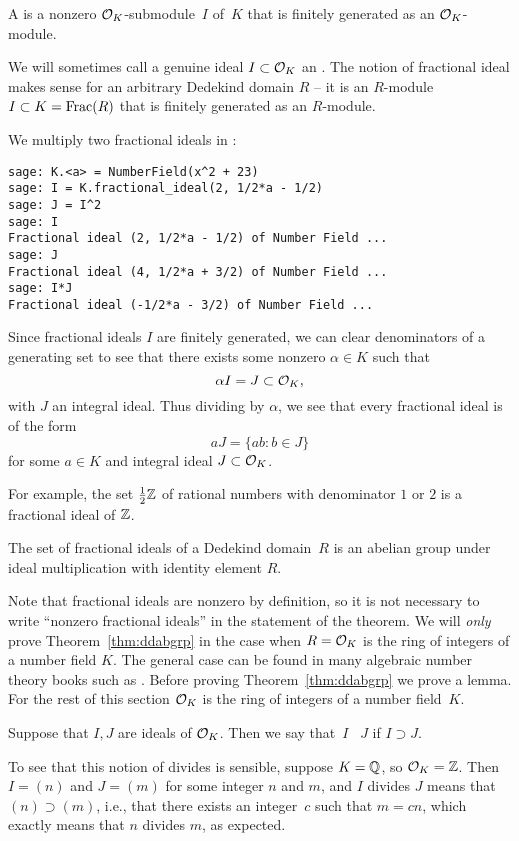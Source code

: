 \begin{definition}\label{def:fracideal}
A  is a nonzero $\mathcal{O}_K$-submodule~$I$ of~$K$ that
is finitely generated as an $\mathcal{O}_K$-module.
\end{definition}
We will sometimes call a genuine ideal $I\subset \mathcal{O}_K$ an
.  The notion of fractional ideal makes
sense for an arbitrary Dedekind domain $R$ -- it is an
$R$-module $I\subset K=\operatorname{Frac}(R)$ that is finitely
generated as an $R$-module.

\begin{example}
We multiply two fractional ideals in \sage:
\begin{lstlisting}
sage: K.<a> = NumberField(x^2 + 23)
sage: I = K.fractional_ideal(2, 1/2*a - 1/2)
sage: J = I^2
sage: I
Fractional ideal (2, 1/2*a - 1/2) of Number Field ...
sage: J
Fractional ideal (4, 1/2*a + 3/2) of Number Field ...
sage: I*J
Fractional ideal (-1/2*a - 3/2) of Number Field ...
\end{lstlisting}
\end{example}

Since fractional ideals $I$ are finitely generated, we can clear
denominators of a generating set to see that there exists some nonzero
$\alpha\in K$ such that
$$
\alpha I = J \subset \mathcal{O}_K,
$$
with $J$ an integral ideal.  Thus dividing by $\alpha$, we see
that every fractional ideal is
of the form
$$a J = \{a b : b \in J\}$$
for some $a\in K$ and integral ideal $J\subset \mathcal{O}_K$.

For example, the set $\frac{1}{2}\mathbb{Z}$ of rational numbers with
denominator $1$ or $2$ is a fractional ideal of $\mathbb{Z}$.

\begin{theorem}\label{thm:ddabgrp}
The set of fractional ideals of a Dedekind domain~$R$ is an
abelian group under ideal multiplication with identity element $R$.
\end{theorem}
Note that fractional ideals are nonzero by definition, so it is not
necessary to write ``nonzero fractional ideals'' in the statement of
the theorem. We will {\em only} prove Theorem~\ref{thm:ddabgrp} in the
case when $R=\mathcal{O}_K$ is the ring of integers of a number field $K$. The
general case can be found in many algebraic number theory books such
as \cite[Chapter 3]{marcus1977number}.
Before proving Theorem~\ref{thm:ddabgrp} we prove a lemma.  For the
rest of this section $\mathcal{O}_K$ is the ring of integers of a number
field~$K$.


\begin{definition}
Suppose that $I,J$ are ideals of $\mathcal{O}_K$.
Then we say that~$I$ ~$J$ if $I\supset J$.
\end{definition}
To see that this notion of divides is sensible, suppose $K=\mathbb{Q}$, so
$\mathcal{O}_K=\mathbb{Z}$.  Then $I=(n)$ and $J=(m)$ for some integer $n$ and $m$, and
$I$ divides $J$ means that $(n)\supset (m)$, i.e., that there exists
an integer~$c$ such that $m=cn$, which exactly means that $n$ divides
$m$, as expected.

